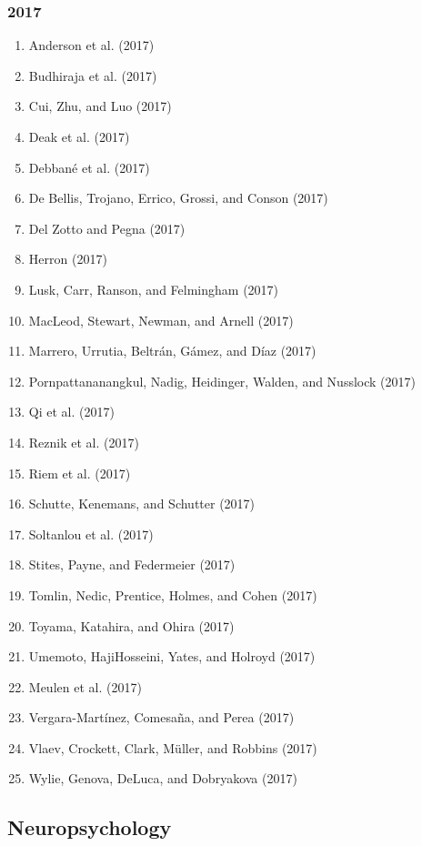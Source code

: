 \documentclass[english,man]{apa6}
\providecommand{\tightlist}{%
  \setlength{\itemsep}{0pt}\setlength{\parskip}{0pt}}
\theoremstyle{definition}
\theoremstyle{definition}
\theoremstyle{definition}
\theoremstyle{remark}
\begin{document}
\subsubsection{2017}\label{section-37}

\begin{enumerate}
\def\labelenumi{\arabic{enumi})}
\tightlist
\item
  Anderson et al. (2017)
\item
  Budhiraja et al. (2017)
\item
  Cui, Zhu, and Luo (2017)
\item
  Deak et al. (2017)
\item
  Debbané et al. (2017)
\item
  De Bellis, Trojano, Errico, Grossi, and Conson (2017)
\item
  Del Zotto and Pegna (2017)
\item
  Herron (2017)
\item
  Lusk, Carr, Ranson, and Felmingham (2017)
\item
  MacLeod, Stewart, Newman, and Arnell (2017)
\item
  Marrero, Urrutia, Beltrán, Gámez, and Díaz (2017)
\item
  Pornpattananangkul, Nadig, Heidinger, Walden, and Nusslock (2017)
\item
  Qi et al. (2017)
\item
  Reznik et al. (2017)
\item
  Riem et al. (2017)
\item
  Schutte, Kenemans, and Schutter (2017)
\item
  Soltanlou et al. (2017)
\item
  Stites, Payne, and Federmeier (2017)
\item
  Tomlin, Nedic, Prentice, Holmes, and Cohen (2017)
\item
  Toyama, Katahira, and Ohira (2017)
\item
  Umemoto, HajiHosseini, Yates, and Holroyd (2017)
\item
  Meulen et al. (2017)
\item
  Vergara-Martínez, Comesaña, and Perea (2017)
\item
  Vlaev, Crockett, Clark, Müller, and Robbins (2017)
\item
  Wylie, Genova, DeLuca, and Dobryakova (2017)
\end{enumerate}

\subsection{Neuropsychology}\label{neuropsychology}
\end{document}
